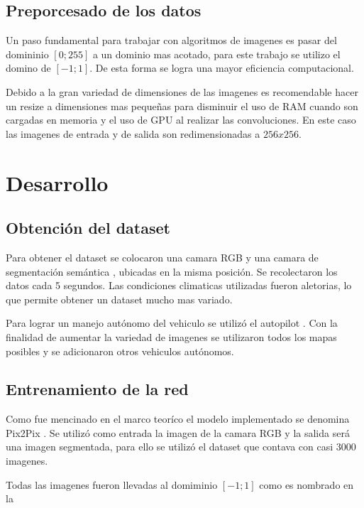 \documentclass[]{IEEEtran}
\begin{document}
    \subsection{Preporcesado de los datos}

    Un paso fundamental para trabajar con algoritmos de imagenes es pasar del domininio $[0;255]$ a 
    un dominio mas acotado, para este trabajo se utilizo el domino de $[-1;1]$. De esta forma se logra 
    una mayor eficiencia computacional.

    Debido a la gran variedad de dimensiones de las imagenes es recomendable hacer un resize a dimensiones mas pequeñas 
    para disminuir el uso de RAM cuando son cargadas en memoria y el uso de GPU al realizar las convoluciones. En 
    este caso las imagenes de entrada y de salida son redimensionadas a $256x256$.

    \section{Desarrollo}

    \subsection{Obtención del dataset}

    Para obtener el dataset se colocaron una camara RGB y una camara de segmentación semántica
    \cite{CARLA-Sensors-Reference}, ubicadas en la misma posición. Se recolectaron los datos 
    cada 5 segundos. Las condiciones climaticas utilizadas fueron aletorias, lo que permite 
    obtener un dataset mucho mas variado.

    Para lograr un manejo autónomo del vehiculo se utilizó el autopilot \cite{CARLA-Documentation}. 
    Con la finalidad de aumentar la variedad de imagenes se utilizaron todos los mapas posibles y 
    se adicionaron otros vehiculos autónomos.

    \subsection{Entrenamiento de la red}

    Como fue mencinado en el marco teoríco el modelo implementado se denomina Pix2Pix \cite{Pix2Pix}.
    Se utilizó como entrada la imagen de la camara RGB y la salida será una imagen segmentada, para ello se utilizó
    el dataset que contava con casi 3000 imagenes. 

    Todas las imagenes fueron llevadas al domiminio $[-1;1]$ como es nombrado en la 
\end{document}
